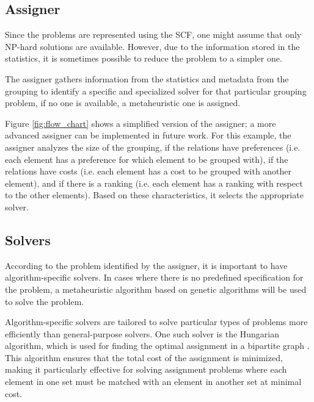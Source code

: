    

    \subsection{Assigner}
        Since the problems are represented using the SCF, one might assume that only NP-hard solutions are available. However, due to the information stored in the statistics, it is sometimes possible to reduce the problem to a simpler one.

        The assigner gathers information from the statistics and metadata from the grouping to identify a specific and specialized solver for that particular grouping problem, if no one is available, a metaheuristic one is assigned.

        Figure \ref{fig:flow_chart} shows a simplified version of the assigner; a more advanced assigner can be implemented in future work.
        For this example, the assigner analyzes the size of the grouping, if the relations have preferences (i.e. each element has a preference for which element to be grouped with), if the relations have costs (i.e. each element has a cost to be grouped with another element), and if there is a ranking (i.e. each element has a ranking with respect to the other elements). Based on these characteristics, it selects the appropriate solver.
        

    \subsection{Solvers} \label{sec:solvers}
    
        According to the problem identified by the assigner, it is important to have algorithm-specific solvers. In cases where there is no predefined specification for the problem, a metaheuristic algorithm based on genetic algorithms will be used to solve the problem.

        Algorithm-specific solvers are tailored to solve particular types of problems more efficiently than general-purpose solvers. One such solver is the Hungarian algorithm, which is used for finding the optimal assignment in a bipartite graph \cite{kuhn1955hungarian}. This algorithm ensures that the total cost of the assignment is minimized, making it particularly effective for solving assignment problems where each element in one set must be matched with an element in another set at minimal cost.


